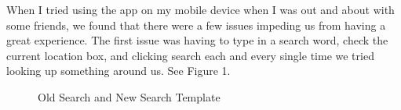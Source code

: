 \documentclass[11pt]{article}
\begin{document}
When I tried using the app on my mobile device when I was out and about with some friends, we found that there were a few issues impeding us from having a great experience. The first issue was having to type in a search word, check the current location box, and clicking search each and every single time we tried looking up something around us. See Figure 1.

\begin{figure}[H]
    \centering
    \qquad
    \caption{Old Search and New Search Template}
    \label{fig:example}
\end{figure}
\end{document}
